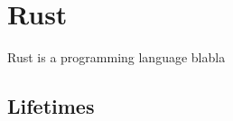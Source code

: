 \chapter{Rust}

Rust is a programming language blabla


\section{Lifetimes\label{sec:rust-lifetimes}}
